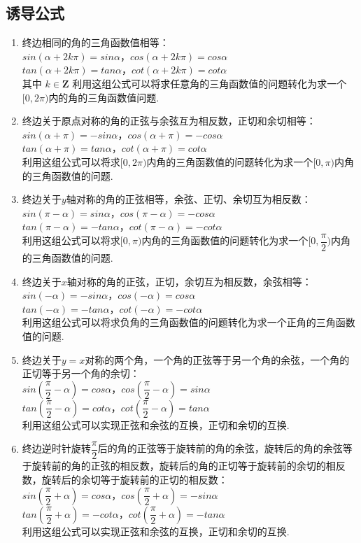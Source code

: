 \subsection*{诱导公式}
\begin{enumerate}
    \item 终边相同的角的三角函数值相等： \\
    $sin(\alpha + 2k\pi) = sin \alpha$，$cos(\alpha + 2k\pi) = cos \alpha$ \\
    $tan(\alpha + 2k\pi) = tan \alpha$，$cot(\alpha + 2k\pi) = cot \alpha$ \\
    其中 $k \in \mathbf{Z}$
    利用这组公式可以将求任意角的三角函数值的问题转化为求一个$[0, 2\pi)$内的角的三角函数值问题.
    \item 终边关于原点对称的角的正弦与余弦互为相反数，正切和余切相等：\\
    $sin(\alpha + \pi) = -sin \alpha$，$cos(\alpha + \pi) = -cos \alpha$ \\
    $tan(\alpha + \pi) = tan \alpha$，$cot(\alpha + \pi) = cot \alpha$\\
    利用这组公式可以将求$[0, 2\pi)$内角的三角函数值的问题转化为求一个$[0, \pi)$内角的三角函数值的问题.    
    \item 终边关于$y$轴对称的角的正弦相等，余弦、正切、余切互为相反数：\\
    $sin(\pi-\alpha) = sin \alpha$，$cos(\pi-\alpha) = -cos \alpha$ \\
    $tan(\pi-\alpha) = -tan \alpha$，$cot(\pi-\alpha) = -cot \alpha$\\
    利用这组公式可以将求$[0, \pi)$内角的三角函数值的问题转化为求一个$[0, \dfrac{\pi}{2})$内角的三角函数值的问题.
    \item 终边关于$x$轴对称的角的正弦，正切，余切互为相反数，余弦相等：\\
    $sin(-\alpha) = -sin \alpha$，$cos(-\alpha) = cos \alpha$ \\
    $tan(-\alpha) = -tan \alpha$，$cot(-\alpha) = -cot \alpha$\\
    利用这组公式可以将求负角的三角函数值的问题转化为求一个正角的三角函数值的问题.
    \item 终边关于$y = x$对称的两个角，一个角的正弦等于另一个角的余弦，一个角的正切等于另一个角的余切：\\
    $sin(\dfrac{\pi}{2}-\alpha) = cos \alpha$，$cos(\dfrac{\pi}{2}-\alpha) = sin \alpha$ \\
    $tan(\dfrac{\pi}{2}-\alpha) = cot \alpha$，$cot(\dfrac{\pi}{2}-\alpha) = tan \alpha$ \\
    利用这组公式可以实现正弦和余弦的互换，正切和余切的互换.
    \item 终边逆时针旋转$\dfrac{\pi}{2}$后的角的正弦等于旋转前的角的余弦，旋转后的角的余弦等于旋转前的角的正弦的相反数，旋转后的角的正切等于旋转前的余切的相反数，旋转后的余切等于旋转前的正切的相反数：\\
    $sin(\dfrac{\pi}{2}+\alpha) = cos \alpha$，$cos(\dfrac{\pi}{2}+\alpha) = -sin \alpha$ \\
    $tan(\dfrac{\pi}{2}+\alpha) = -cot \alpha$，$cot(\dfrac{\pi}{2}+\alpha) = -tan \alpha$ \\
    利用这组公式可以实现正弦和余弦的互换，正切和余切的互换.
\end{enumerate}
